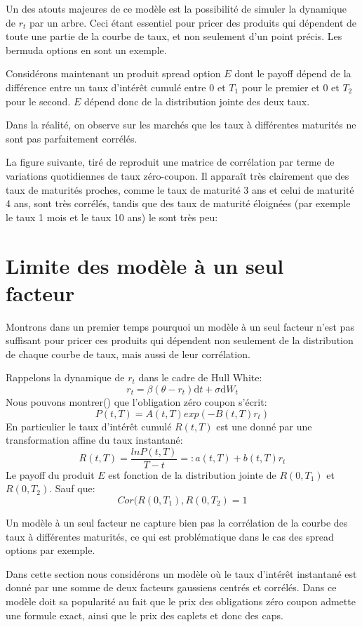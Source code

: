 Un des atouts majeures de ce modèle est la possibilité de simuler la dynamique de $r_t$ par un arbre. Ceci étant essentiel pour pricer des produits qui dépendent de toute une partie de la courbe de taux, et non seulement d'un point précis. Les bermuda options en sont un exemple.

Considérons maintenant un produit spread option $E$ dont le payoff  dépend  de la différence entre un taux d'intérêt cumulé entre $0$ et $T_1$ pour le premier et $0$ et $T_2$ pour le second. $E$ dépend donc de la distribution jointe des deux taux.

Dans la réalité, on observe sur les marchés que les taux à différentes maturités ne sont pas parfaitement corrélés. 

La figure suivante, tiré de \cite{Central} reproduit une matrice de corrélation par terme de variations quotidiennes de taux zéro-coupon. Il apparaît très clairement que des taux de maturités proches, comme le taux de maturité 3 ans et celui de maturité 4 ans, sont très corrélés, tandis que des taux de maturité éloignées (par exemple le taux 1 mois et le taux 10 ans) le sont très peu:


\section{Limite des modèle à un seul facteur}
Montrons dans un premier temps pourquoi un modèle à un seul facteur n'est pas suffisant pour pricer ces produits qui dépendent non seulement de la distribution de chaque courbe de taux, mais aussi de leur corrélation. 

Rappelons la dynamique de $r_t$ dans le cadre de Hull White:
$$r_t = \beta (\theta - r_t)  \mathrm{d}t  + \sigma \mathrm{d}W_t$$
Nous pouvons montrer(\cite{Brugo}) que l'obligation zéro coupon s'écrit:
$$P(t, T) = A(t, T) exp(-B(t, T) r_t)$$
En particulier le taux d'intérêt cumulé $R(t, T)$ est une donné par une transformation affine du taux instantané:
$$R(t, T) = \frac{ln P(t, T)}{T-t} =: a(t, T) + b(t, T) r_t$$
Le payoff du produit $E$ est fonction de la distribution jointe de $R(0, T_1)$ et $R(0, T_2)$. Sauf que:
$$Cor(R(0, T_1), R(0, T_2) = 1$$

Un modèle à un seul facteur ne capture bien pas la corrélation de la courbe des taux à différentes maturités, ce qui est problématique dans le cas des spread options par exemple.

Dans cette section nous considérons un modèle où le taux d'intérêt instantané est donné par une somme de deux facteurs gaussiens centrés et corrélés. Dans ce modèle doit sa popularité au fait que le prix des obligations zéro coupon admette une formule exact, ainsi que le prix des caplets et donc des caps.


